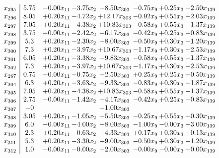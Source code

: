 \documentclass[8pt]{article}
\begin{document}
\[\begin{array}{c| c c@{\hskip 2pt} c@{\hskip 2pt} c@{\hskip 2pt} c@{\hskip 2pt} c@{\hskip 2pt} c@{\hskip 2pt} }
 x_{295}   &  5.75 & -0.00 x_{11} & -3.75 x_{2} & +  8.50 x_{303} & -0.75 x_{9} & +  0.25 x_{3} & -2.50 x_{139}\\
 x_{296}   &  8.05 & +  0.20 x_{11} & -4.72 x_{2} & + 12.17 x_{303} & -0.92 x_{9} & +  0.55 x_{3} & -2.03 x_{139}\\
 x_{297}   &  7.05 & +  0.20 x_{11} & -4.38 x_{2} & + 10.83 x_{303} & -0.58 x_{9} & +  0.55 x_{3} & -1.37 x_{139}\\
 x_{298}   &  3.75 & -0.00 x_{11} & -2.42 x_{2} & +  6.17 x_{303} & -0.42 x_{9} & +  0.25 x_{3} & -0.83 x_{139}\\
 x_{299}   &  5.3 & +  0.20 x_{11} & -2.30 x_{2} & +  8.00 x_{303} & -0.50 x_{9} & +  0.30 x_{3} & -1.20 x_{139}\\
 x_{300}   &  7.3 & +  0.20 x_{11} & -3.97 x_{2} & + 10.67 x_{303} & -1.17 x_{9} & +  0.30 x_{3} & -2.53 x_{139}\\
 x_{301}   &  6.05 & +  0.20 x_{11} & -3.38 x_{2} & +  9.83 x_{303} & -0.58 x_{9} & +  0.55 x_{3} & -1.37 x_{139}\\
 x_{302}   &  7.3 & +  0.20 x_{11} & -3.97 x_{2} & + 10.67 x_{303} & -1.17 x_{9} & +  0.30 x_{3} & -2.53 x_{139}\\
 x_{267}   &  0.75 & -0.00 x_{11} & -0.75 x_{2} & +  2.50 x_{303} & +  0.25 x_{9} & +  0.25 x_{3} & +  0.50 x_{139}\\
 x_{304}   &  6.3 & +  0.20 x_{11} & -3.63 x_{2} & +  9.33 x_{303} & -0.83 x_{9} & +  0.30 x_{3} & -1.87 x_{139}\\
 x_{305}   &  7.05 & +  0.20 x_{11} & -4.38 x_{2} & + 10.83 x_{303} & -0.58 x_{9} & +  0.55 x_{3} & -1.37 x_{139}\\
 x_{306}   &  2.75 & -0.00 x_{11} & -1.42 x_{2} & +  4.17 x_{303} & -0.42 x_{9} & +  0.25 x_{3} & -0.83 x_{139}\\
 x_{307}   &  -0  &    &   & +  1.00 x_{303} &    &    &   \\
 x_{308}   &  3.05 & +  0.20 x_{11} & -1.05 x_{2} & +  5.50 x_{303} & -0.25 x_{9} & +  0.55 x_{3} & +  0.30 x_{139}\\
 x_{309}   &  6.0 & -0.00 x_{11} & -4.00 x_{2} & +  8.00 x_{303} & -1.00 x_{9} & -0.00 x_{3} & -3.00 x_{139}\\
 x_{310}   &  2.3 & +  0.20 x_{11} & -0.63 x_{2} & +  4.33 x_{303} & +  0.17 x_{9} & +  0.30 x_{3} & +  0.13 x_{139}\\
 x_{311}   &  5.3 & +  0.20 x_{11} & -3.30 x_{2} & +  9.00 x_{303} & -0.50 x_{9} & +  0.30 x_{3} & -1.20 x_{139}\\
 x_{312}   &  1.0 & -0.00 x_{11} & -0.00 x_{2} & +  2.00 x_{303} & -0.00 x_{9} & -0.00 x_{3} & +  0.00 x_{139}\\

\end{array}\]
\end{document}
